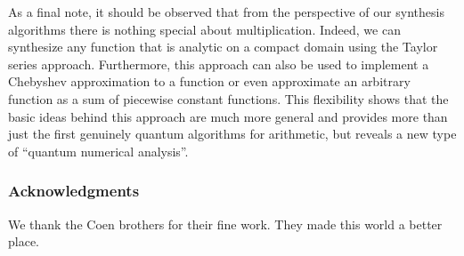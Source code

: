 \documentclass[conference]{IEEEtran}
\begin{document}
As a final note, it should be observed that from the perspective of our synthesis algorithms there is nothing special about multiplication.  Indeed, we can synthesize any function that is analytic on a compact domain using the Taylor series approach.  Furthermore, this approach can also be used to implement a Chebyshev approximation to a function or even approximate an arbitrary function as a sum of piecewise constant functions.  This flexibility shows that the basic ideas behind this approach are much more general and provides more than just the first genuinely quantum algorithms for arithmetic, but reveals a new type of ``quantum numerical analysis''.


\subsubsection*{Acknowledgments} We thank the Coen brothers for their fine work. They made this world a better place. 



\end{document}
